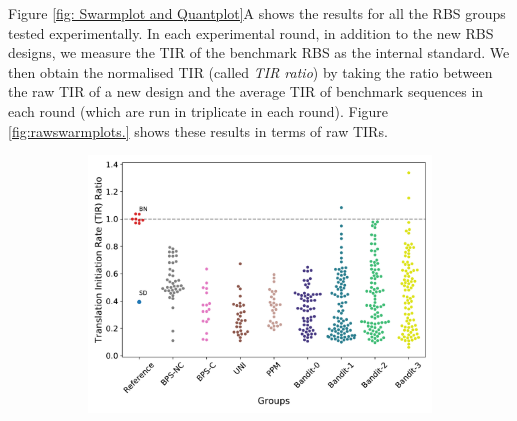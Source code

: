 \documentclass{article}
\begin{document}
Figure \ref{fig: Swarmplot and Quantplot}A shows the results for all the RBS groups tested experimentally. 
In each experimental round, in addition to the new RBS designs, we measure the TIR of the benchmark RBS as the internal standard. 
We then obtain the normalised TIR (called \textit{TIR ratio}) by taking the ratio between the raw TIR of a new design and the average TIR of benchmark sequences in each round (which are run in triplicate in each round).
Figure \ref{fig:rawswarmplots.} shows these results in terms of raw TIRs.\\

\begin{figure}[!ht]
    \centering
    \begin{subfigure}[b]{0.48\textwidth}
        \centering
        \caption{}
        \includegraphics[scale=0.35]{plots/Main_Paper/swarmplot.pdf}
    \end{subfigure}
    \begin{subfigure}[b]{0.25\textwidth}
        \centering
        \caption{}

\end{subfigure}
\end{figure}
\end{document}
